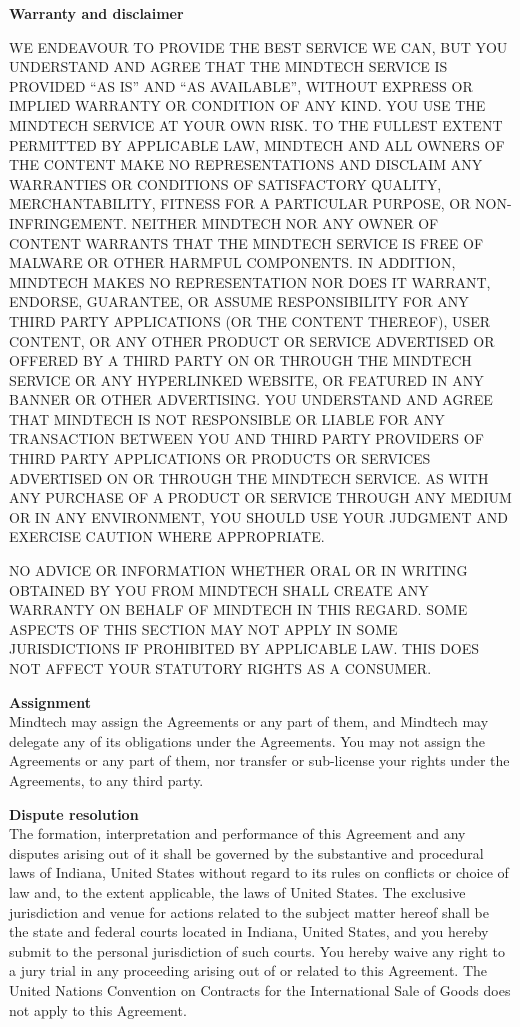 \documentclass[letterpaper,10pt]{article}
\begin{document}
\begin{appendices}
\large{\textbf{Warranty and disclaimer}} \\
\small{WE ENDEAVOUR TO PROVIDE THE BEST SERVICE WE CAN, BUT YOU UNDERSTAND AND AGREE THAT THE MINDTECH SERVICE IS PROVIDED “AS IS” AND “AS AVAILABLE”, WITHOUT EXPRESS OR IMPLIED WARRANTY OR CONDITION OF ANY KIND. YOU USE THE MINDTECH SERVICE AT YOUR OWN RISK. TO THE FULLEST EXTENT PERMITTED BY APPLICABLE LAW, MINDTECH AND ALL OWNERS OF THE CONTENT MAKE NO REPRESENTATIONS AND DISCLAIM ANY WARRANTIES OR CONDITIONS OF SATISFACTORY QUALITY, MERCHANTABILITY, FITNESS FOR A PARTICULAR PURPOSE, OR NON-INFRINGEMENT. NEITHER MINDTECH NOR ANY OWNER OF CONTENT WARRANTS THAT THE MINDTECH SERVICE IS FREE OF MALWARE OR OTHER HARMFUL COMPONENTS. IN ADDITION, MINDTECH MAKES NO REPRESENTATION NOR DOES IT WARRANT, ENDORSE, GUARANTEE, OR ASSUME RESPONSIBILITY FOR ANY THIRD PARTY APPLICATIONS (OR THE CONTENT THEREOF), USER CONTENT, OR ANY OTHER PRODUCT OR SERVICE ADVERTISED OR OFFERED BY A THIRD PARTY ON OR THROUGH THE MINDTECH SERVICE OR ANY HYPERLINKED WEBSITE, OR FEATURED IN ANY BANNER OR OTHER ADVERTISING. YOU UNDERSTAND AND AGREE THAT MINDTECH IS NOT RESPONSIBLE OR LIABLE FOR ANY TRANSACTION BETWEEN YOU AND THIRD PARTY PROVIDERS OF THIRD PARTY APPLICATIONS OR PRODUCTS OR SERVICES ADVERTISED ON OR THROUGH THE MINDTECH SERVICE. AS WITH ANY PURCHASE OF A PRODUCT OR SERVICE THROUGH ANY MEDIUM OR IN ANY ENVIRONMENT, YOU SHOULD USE YOUR JUDGMENT AND EXERCISE CAUTION WHERE APPROPRIATE. 

NO ADVICE OR INFORMATION WHETHER ORAL OR IN WRITING OBTAINED BY YOU FROM MINDTECH SHALL CREATE ANY WARRANTY ON BEHALF OF MINDTECH IN THIS REGARD. SOME ASPECTS OF THIS SECTION MAY NOT APPLY IN SOME JURISDICTIONS IF PROHIBITED BY APPLICABLE LAW.
THIS DOES NOT AFFECT YOUR STATUTORY RIGHTS AS A CONSUMER.}

\large{\textbf{Assignment}} \\
Mindtech may assign the Agreements or any part of them, and Mindtech may delegate any of its obligations under the Agreements. You may not assign the Agreements or any part of them, nor transfer or sub-license your rights under the Agreements, to any third party.

\large{\textbf{Dispute resolution}} \\
The formation, interpretation and performance of this Agreement and any disputes arising out of it shall be governed by the substantive and procedural laws of Indiana, United States without regard to its rules on conflicts or choice of law and, to the extent applicable, the laws of United States. The exclusive jurisdiction and venue for actions related to the subject matter hereof shall be the state and federal courts located in Indiana, United States, and you hereby submit to the personal jurisdiction of such courts. You hereby waive any right to a jury trial in any proceeding arising out of or related to this Agreement. The United Nations Convention on Contracts for the International Sale of Goods does not apply to this Agreement.


\end{appendices}
\end{document}
